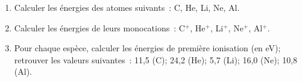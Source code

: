 \begin{enumerate}[\bf 1)]
\item Calculer les \'energies des atomes suivants~: C, He, Li, Ne, Al.
\item Calculer les \'energies de leurs monocations~: C$^+$, He$^+$, Li$^+$, Ne$^+$, Al$^+$.
\item Pour chaque esp\`ece, calculer les énergies de première ionisation (en eV); retrouver les valeurs suivantes~:
11,5 (C); 24,2 (He); 5,7 (Li); 16,0 (Ne); 10,8 (Al).
\end{enumerate}
